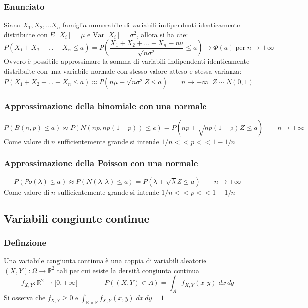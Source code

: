 \documentclass[a4paper]{article}
\newcommand\R{\mathbb{R}}     %
\newcommand\Rd{\mathbb{R}^2}  %
\newcommand\var{\text{Var}}   %
\begin{document}
\subsubsection*{Enunciato}
Siano \(X_1, X_2, \dots X_n\) famiglia numerabile di variabili indipendenti identicamente distribuite con \(E[X_i] = \mu\) e
\(\var[X_i] = \sigma^2\), allora si ha che:
\[P\left(\overline{X_1 + X_2 + \dots + X_n} \leq a\right) = P\left(\frac{X_1 + X_2 + \dots + X_n - n \mu}{\sqrt{n \sigma^2}} \leq a\right) \rightarrow \Phi(a) \; \text{per} \; n \to +\infty\]
Ovvero è possibile approssimare la somma di variabili indipendenti identicamente distribuite con una variabile normale con 
stesso valore atteso e stessa varianza:
\[P(X_1 + X_2 + \dots + X_n \leq a) \approx P(n\mu + \sqrt{n \sigma^2} Z \leq a) \qquad n \to +\infty \;\; Z \sim N(0,1)\]

\subsubsection*{Approssimazione della binomiale con una normale}
\[P(B(n,p) \leq a) \approx P(N(np,np(1-p)) \leq a) = P(np + \sqrt{np(1-p)} Z \leq a) \qquad n \to +\infty\]
Come valore di \(n\) sufficientemente grande si intende \(1/n << p << 1-1/n\)

\subsubsection*{Approssimazione della Poisson con una normale}
\[P(Po(\lambda) \leq a) \approx P(N(\lambda,\lambda) \leq a) = P(\lambda + \sqrt{\lambda} Z \leq a) \qquad n \to +\infty\]
Come valore di \(n\) sufficientemente grande si intende \(1/n << p << 1-1/n\)

\newpage

\subsection{Variabili congiunte continue}
\subsubsection*{Definzione}
Una variabile congiunta continua è una coppia di variabili aleatorie \((X,Y) : \Omega \to \Rd\) tali per cui esiste la densità
congiunta continua \[f_{X,Y} : \Rd \to [0, +\infty[ \qquad \qquad P((X,Y) \in A) = \int_A f_{X,Y} (x,y) \; dx \, dy\]
Si osserva che \(f_{X,Y} \geq 0\) e \(\displaystyle \int_{\R \times \R} f_{X,Y}(x,y) \; dx \, dy = 1\)
\end{document}
